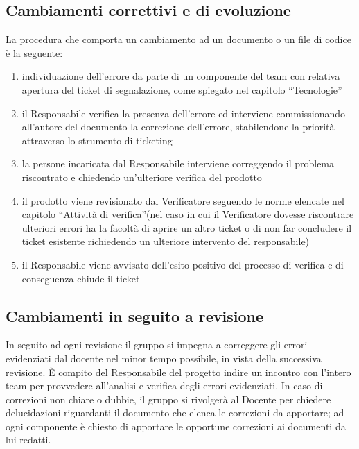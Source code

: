 \documentclass[a4paper,11pt]{article}
\begin{document}
\subsection{Cambiamenti correttivi e di evoluzione}
La procedura che comporta un cambiamento ad un documento o un file di codice \`e la seguente:
\begin{enumerate}
\item individuazione dell'errore da parte di un componente del team con relativa apertura del ticket di segnalazione, come spiegato nel capitolo ``Tecnologie'' 
\item il Responsabile verifica la presenza dell'errore ed interviene commissionando all'autore del documento la correzione dell'errore, stabilendone la priorit\`a attraverso lo strumento di ticketing
\item la persone incaricata dal Responsabile interviene correggendo il problema riscontrato e chiedendo un'ulteriore verifica del prodotto
\item il prodotto viene revisionato dal Verificatore seguendo le norme elencate nel capitolo ``Attivit\`a di verifica''(nel caso in cui il Verificatore dovesse riscontrare ulteriori errori ha la facolt\`a di aprire un altro ticket o di non far concludere il ticket esistente richiedendo un ulteriore intervento del responsabile)
\item il Responsabile viene avvisato dell'esito positivo del processo di verifica e di conseguenza chiude il ticket 
\end{enumerate}
\subsection{Cambiamenti in seguito a revisione}
In seguito ad ogni revisione il gruppo si impegna a correggere gli errori evidenziati dal docente nel minor tempo possibile, in vista della successiva revisione. \`E compito del Responsabile del progetto indire un incontro con l'intero team per provvedere all'analisi e verifica  degli errori evidenziati. In caso di correzioni non chiare o dubbie, il gruppo si rivolger\`a al Docente per chiedere delucidazioni riguardanti il documento che elenca le correzioni da apportare; ad ogni componente \`e chiesto di apportare le opportune correzioni ai documenti da lui redatti.
\end{document}
